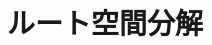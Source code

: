 \documentclass{ltjsarticle}
\theoremstyle{mystyle} %
\numberwithin{equation}{section}
\newcommand{\btr}{\blacktriangleright}
\begin{document}

\section{ルート空間分解}
\end{document}
